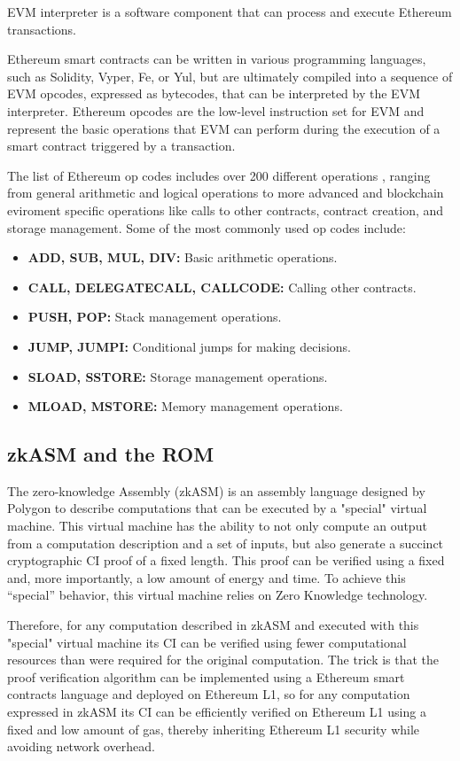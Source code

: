 EVM interpreter is a software component that can process and execute Ethereum transactions. 

Ethereum smart contracts can be written in various programming languages, such as Solidity, Vyper, Fe, or Yul, but are ultimately compiled into a sequence of EVM opcodes, expressed as bytecodes, that can be interpreted by the EVM interpreter. Ethereum opcodes are the low-level instruction set for EVM and represent the basic operations that EVM can perform during the execution of a smart contract triggered by a transaction.

The list of Ethereum op codes includes over 200 different operations , ranging from general arithmetic and logical operations to more advanced and blockchain eviroment specific operations like calls to other contracts, contract creation, and storage management. Some of the most commonly used op codes include:

\begin{itemize}
    \item \textbf{ADD, SUB, MUL, DIV:} Basic arithmetic operations.
    \item \textbf{CALL, DELEGATECALL, CALLCODE:} Calling other contracts.
    \item \textbf{PUSH, POP:} Stack management operations.
    \item \textbf{JUMP, JUMPI:} Conditional jumps for making decisions.
    \item \textbf{SLOAD, SSTORE:} Storage management operations.
    \item \textbf{MLOAD, MSTORE:} Memory management operations.
\end{itemize}

\subsection{zkASM and the ROM}
The zero-knowledge Assembly (zkASM) is an assembly language designed by Polygon to describe computations that can be executed by a "special" virtual machine. This virtual machine has the ability to not only compute an output from a computation description and a set of inputs, but also generate a succinct cryptographic CI proof of a fixed length. This proof can be verified using a fixed and, more importantly, a low amount of energy and time. To achieve this “special” behavior, this virtual machine relies on Zero Knowledge technology. 

Therefore, for any computation described in zkASM and executed with this "special" virtual machine its CI can be verified using fewer computational resources than were required for the original computation. The trick is that the proof verification algorithm can be implemented using a Ethereum smart contracts language and deployed on Ethereum L1, so for any computation expressed in zkASM its CI can be efficiently verified on Ethereum L1 using a fixed and low amount of gas, thereby inheriting Ethereum L1 security while avoiding network overhead. 

